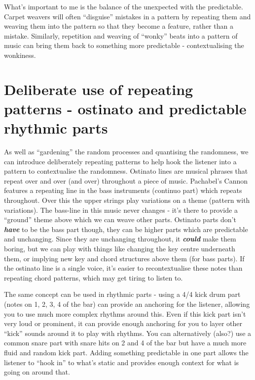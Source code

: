\documentclass[
  12pt,
  letterpaper,
  oneside,
  open=any]{scrbook}
\begin{document}
What's important to me is the balance of the unexpected with the
predictable. Carpet weavers will often ``disguise'' mistakes in a
pattern by repeating them and weaving them into the pattern so that they
become a feature, rather than a mistake. Similarly, repetition and
weaving of ``wonky'' beats into a pattern of music can bring them back
to something more predictable - contextualising the wonkiness.

\section{Deliberate use of repeating patterns - ostinato and predictable
rhythmic
parts}\label{deliberate-use-of-repeating-patterns---ostinato-and-predictable-rhythmic-parts}

As well as ``gardening'' the random processes and quantising the
randomness, we can introduce deliberately repeating patterns to help
hook the listener into a pattern to contextualise the randomness.
Ostinato lines are musical phrases that repeat over and over (and over)
throughout a piece of music. Pachabel's Cannon features a repeating line
in the bass instruments (continuo part) which repeats throughout. Over
this the upper strings play variations on a theme (pattern with
variations). The bass-line in this music never changes - it's there to
provide a ``ground'' theme above which we can weave other parts.
Ostinato parts don't \textbf{\emph{have}} to be the bass part though,
they can be higher parts which are predictable and unchanging. Since
they are unchanging throughout, it \textbf{\emph{could}} make them
boring, but we can play with things like changing the key centre
underneath them, or implying new key and chord structures above them
(for bass parts). If the ostinato line is a single voice, it's easier to
recontextualise these notes than repeating chord patterns, which may get
tiring to listen to.

The same concept can be used in rhythmic parts - using a 4/4 kick drum
part (notes on 1, 2, 3, 4 of the bar) can provide an anchoring for the
listener, allowing you to use much more complex rhythms around this.
Even if this kick part isn't very loud or prominent, it can provide
enough anchoring for you to layer other ``kick'' sounds around it to
play with rhythms. You can alternatively (also?) use a common snare part
with snare hits on 2 and 4 of the bar but have a much more fluid and
random kick part. Adding something predictable in one part allows the
listener to ``hook in'' to what's static and provides enough context for
what is going on around that.
\end{document}
